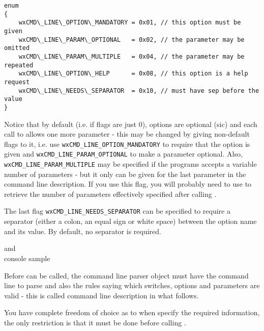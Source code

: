 {\small%
\begin{verbatim}
enum
{
    wxCMD\_LINE\_OPTION\_MANDATORY = 0x01, // this option must be given
    wxCMD\_LINE\_PARAM\_OPTIONAL   = 0x02, // the parameter may be omitted
    wxCMD\_LINE\_PARAM\_MULTIPLE   = 0x04, // the parameter may be repeated
    wxCMD\_LINE\_OPTION\_HELP      = 0x08, // this option is a help request
    wxCMD\_LINE\_NEEDS\_SEPARATOR  = 0x10, // must have sep before the value
}
\end{verbatim}
}

Notice that by default (i.e. if flags are just $0$), options are optional (sic)
and each call to  allows one more
parameter - this may be changed by giving non-default flags to it, i.e. use 
{\tt wxCMD\_LINE\_OPTION\_MANDATORY} to require that the option is given and 
{\tt wxCMD\_LINE\_PARAM\_OPTIONAL} to make a parameter optional. Also, 
{\tt wxCMD\_LINE\_PARAM\_MULTIPLE} may be specified if the programs accepts a
variable number of parameters - but it only can be given for the last parameter
in the command line description. If you use this flag, you will probably need to
use  to retrieve the number
of parameters effectively specified after calling 
.

The last flag {\tt wxCMD\_LINE\_NEEDS\_SEPARATOR} can be specified to require a
separator (either a colon, an equal sign or white space) between the option
name and its value. By default, no separator is required.


 and \\
console sample


\label{wxcmdlineparserconstruction}

Before  can be called, the command line
parser object must have the command line to parse and also the rules saying
which switches, options and parameters are valid - this is called command line
description in what follows.

You have complete freedom of choice as to when specify the required information,
the only restriction is that it must be done before calling 
.

